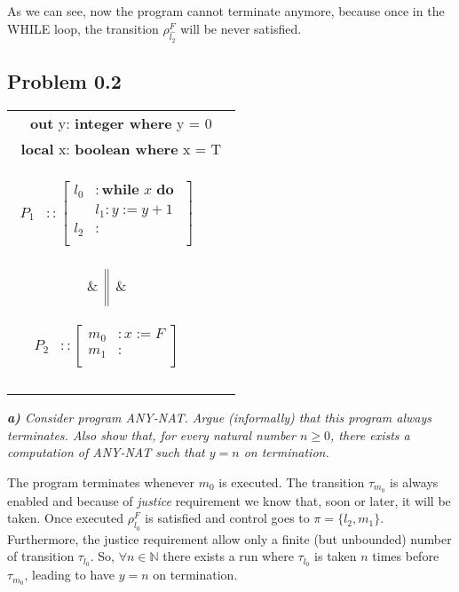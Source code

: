 \documentclass[12pt]{article}
\begin{document}
As we can see, now the program cannot terminate anymore, because once in the WHILE loop, the transition $\rho^F_{\hat{l_2}}$ will be never satisfied.



\subsection*{Problem 0.2}
\begin{center}
\begin{tabular}{|ccc|}
\hline
\multicolumn{3}{|c|}{
\textbf{out} y: \textbf{integer where} y = 0
} \\
\multicolumn{3}{|c|}{
\textbf{local} x: \textbf{boolean where} x = T
} \\
\parbox{4cm}{\begin{align*}
      P_1 &:: \left[ \begin{aligned}
 		l_0 &: \textbf{while }x \textbf{ do } \\ 
 			& l_1: y:= y+1\\
 		l_2 &: \\
		\end{aligned} \right]\\
   \end{align*}}
   &
	$\Bigg{\|}$   
   &
   \parbox{4cm}{\begin{align*}
      P_2 &:: \left[ \begin{aligned}
 		m_0 &: x := F \\
 		m_1 &: \\
		\end{aligned} \right]\\
   \end{align*}}\\
    \\\hline
\end{tabular}
\end{center}



\textit{\textbf{a)} Consider program ANY-NAT. Argue (informally) that this program always terminates. Also show that, for every natural number $n \geq 0$,
there exists a computation of ANY-NAT such that $y = n$ on termination.}

\medskip
The program terminates whenever $m_0$ is executed. The transition $\tau_{m_0}$ is always enabled and because of \textit{justice} requirement we know that, soon or later, it will be taken. Once executed $\rho^F_{l_0}$ is satisfied and control goes to $\pi = \{l_2,m_1\}$.
Furthermore, the justice requirement allow only a finite (but unbounded) number of transition $\tau_{l_0}$. So, $\forall n \in \mathbb{N}$ there exists a run where $\tau_{l_0}$ is taken $n$ times before $\tau_{m_0}$, leading to have $y=n$ on termination.
\end{document}
